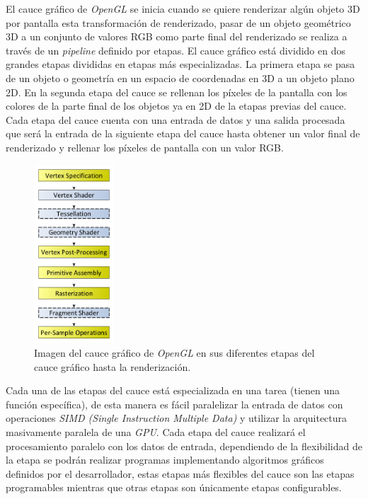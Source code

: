 \documentclass[a4paper]{book}
\begin{document}
El cauce gráfico de \textit{OpenGL} se inicia cuando se quiere renderizar algún objeto 3D por pantalla esta transformación de renderizado,
pasar de un objeto geométrico 3D a un conjunto de valores RGB como parte final del renderizado se realiza a través de un \textit{pipeline}
definido por etapas. El cauce gráfico está dividido en dos grandes etapas divididas en etapas más especializadas. La primera etapa se
pasa de un objeto o geometría en un espacio de coordenadas en 3D a un objeto plano 2D. En la segunda etapa del cauce se rellenan los píxeles
de la pantalla con los colores de la parte final de los objetos ya en 2D de la etapas previas del cauce. Cada etapa del cauce cuenta con una
entrada de datos y una salida procesada que será la entrada de la siguiente etapa del cauce hasta obtener un valor final de renderizado
y rellenar los píxeles de pantalla con un valor RGB.

\begin{figure}[H]
    \centering
    \includegraphics[width=3cm, keepaspectratio]{img/RenderingPipeline.png}
    \caption{Imagen del cauce gráfico de \textit{OpenGL} en sus diferentes etapas del cauce gráfico hasta la renderización.}
    \label{RenderingPipeline}
\end{figure}

Cada una de las etapas del cauce está especializada en una tarea (tienen una función específica), de esta manera es fácil
paralelizar la entrada de datos con operaciones \textit{SIMD (Single Instruction Multiple Data)} y utilizar la arquitectura masivamente
paralela de una \textit{GPU}. Cada etapa del cauce realizará el procesamiento paralelo con los datos de entrada, dependiendo de la
flexibilidad de la etapa se podrán realizar programas implementando algoritmos gráficos definidos por el desarrollador,
estas etapas más flexibles del cauce son las etapas programables mientras que otras etapas son únicamente etapas configurables.
\end{document}
